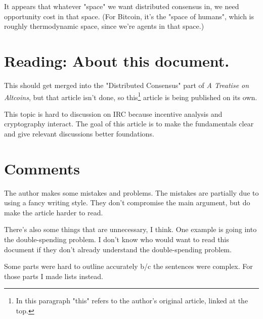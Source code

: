 \documentclass{article}
\begin{document}
It appears that whatever "space" we want distributed consensus in, we need opportunity cost in that space. (For Bitcoin, it's the "space of humans", which is roughly thermodynamic space, since we're agents in that space.)

\section{Reading: About this document.}

This should get merged into the "Distributed Consensus" part of \emph{A Treatise on Altcoins}, but that article isn't done, so this\footnote{In this paragraph "this" refers to the author's original article, linked at the top.} article is being published on its own.

This topic is hard to discussion on IRC because incentive analysis and cryptography interact. The goal of this article is to make the fundamentals clear and give relevant discussions better foundations.

\section{Comments}

The author makes some mistakes and problems. The mistakes are partially due to using a fancy writing style. They don't compromise the main argument, but do make the article harder to read.

There's also some things that are unnecessary, I think. One example is going into the double-spending problem. I don't know who would want to read this document if they don't already understand the double-spending problem.

Some parts were hard to outline accurately b/c the sentences were complex. For those parts I made lists instead.
\end{document}
